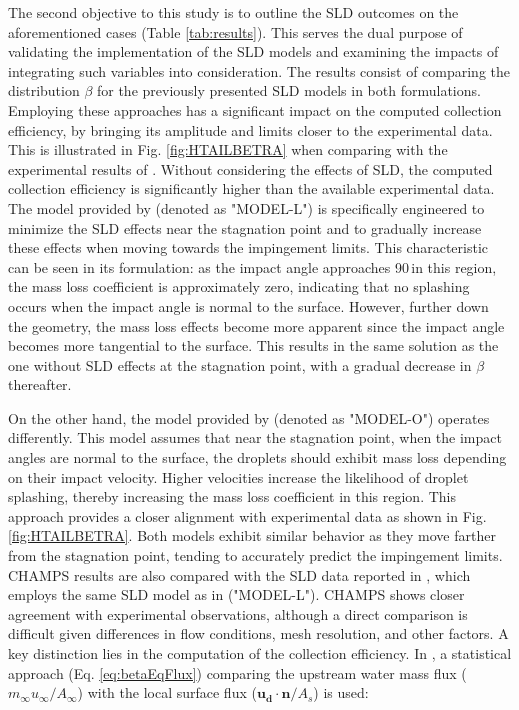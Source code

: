 The second objective to this study is to outline the SLD outcomes on the aforementioned cases (Table \ref{tab:results}). This serves the dual purpose of validating the implementation of the SLD models and examining the impacts of integrating such variables into consideration. The results consist of comparing the distribution $\beta$ for the previously presented SLD models in both formulations. Employing these approaches has a significant impact on the computed collection efficiency, by bringing its amplitude and limits closer to the experimental data. This is illustrated in Fig. \ref{fig:HTAILBETRA} when comparing with the experimental results of \cite{papadakism2004water}. Without considering the effects of SLD, the computed collection efficiency is significantly higher than the available experimental data. The model provided by \cite{wright2004semi} (denoted as "MODEL-L") is specifically engineered to minimize the SLD effects near the stagnation point and to gradually increase these effects when moving towards the impingement limits. This characteristic can be seen in its formulation: as the impact angle approaches 90\textdegree $\, $in this region, the mass loss coefficient is approximately zero, indicating that no splashing occurs when the impact angle is normal to the surface. However, further down the geometry, the mass loss effects become more apparent since the impact angle becomes more tangential to the surface. This results in the same solution as the one without SLD effects at the stagnation point, with a gradual decrease in $\beta$ thereafter.

On the other hand, the model provided by \cite{trontin2016revisited} (denoted as "MODEL-O") operates differently. This model assumes that near the stagnation point, when the impact angles are normal to the surface, the droplets should exhibit mass loss depending on their impact velocity. Higher velocities increase the likelihood of droplet splashing, thereby increasing the mass loss coefficient in this region. This approach provides a closer alignment with experimental data as shown in Fig. \ref{fig:HTAILBETRA}. Both models exhibit similar behavior as they move farther from the stagnation point, tending to accurately predict the impingement limits. CHAMPS results are also compared with the SLD data reported in \cite{bellosta2023lagrangian}, which employs the same SLD model as in \cite{wright2004semi} ("MODEL-L"). CHAMPS shows closer agreement with experimental observations, although a direct comparison is difficult given differences in flow conditions, mesh resolution, and other factors. A key distinction lies in the computation of the collection efficiency. In \cite{bellosta2023lagrangian}, a statistical approach (Eq. \ref{eq:betaEqFlux}) comparing the upstream water mass flux ($m_\infty u_\infty / A_\infty$) with the local surface flux ($\boldsymbol{u_d} \cdot \boldsymbol{n} / A_s$) is used:

